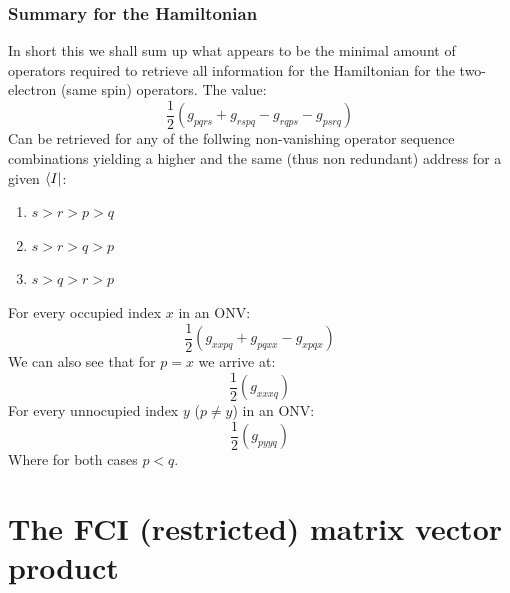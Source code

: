 \subsubsection{Summary for the Hamiltonian}
In short this we shall sum up what appears to be the minimal amount of operators required to retrieve all information for the Hamiltonian for the two-electron (same spin) operators.
The value:
\begin{equation}
  \frac{1}{2} (g_{pqrs} + g_{rspq} - g_{rqps} - g_{psrq})
\end{equation}
 Can be retrieved for any of the follwing non-vanishing operator sequence combinations yielding a higher and the same (thus non redundant) address for a given $\bra{I}$:
\begin{enumerate}
  \item $s > r > p > q$
  \item $s > r > q > p$
  \item $s > q > r > p$
\end{enumerate}
For every occupied index $x$ in an ONV:
\begin{equation}
  \frac{1}{2} (g_{xxpq} + g_{pqxx} - g_{xpqx})
\end{equation}
We can also see that for $p=x$ we arrive at:
\begin{equation}
  \frac{1}{2} (g_{xxxq})
\end{equation}
For every unnocupied index $y$ ($p \neq y$) in an ONV:
\begin{equation}
  \frac{1}{2} (g_{pyyq})
\end{equation}
Where for both cases $p<q$.

\section{The FCI (restricted) matrix vector product}

